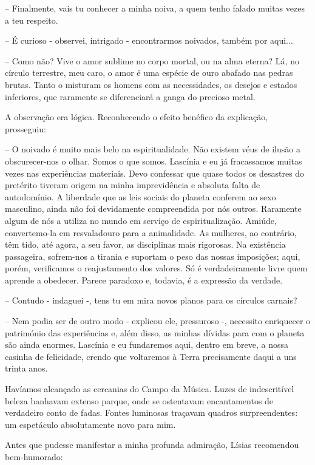 \documentclass[portuguese,12pt,a4paper]{scrbook}
\begin{document}
	– Finalmente, vais tu conhecer a minha noiva, a quem tenho falado muitas vezes a teu respeito.
	
	– É curioso - observei, intrigado - encontrarmos noivados, também por aqui...
	
	– Como não? Vive o amor sublime no corpo mortal, ou na alma eterna? Lá, no círculo terrestre, meu caro, o amor é uma espécie de ouro abafado nas pedras brutas. Tanto o misturam os homens com as necessidades, os desejos e estados inferiores, que raramente se diferenciará a ganga do precioso metal.
	
	A observação era lógica. Reconhecendo o efeito benéfico da explicação, prosseguiu:
	
	– O noivado é muito mais belo na espiritualidade. Não existem véus de ilusão a obscurecer-nos o olhar. Somos o que somos. Lascínia e eu já fracassamos muitas vezes nas experiências materiais. Devo confessar que quase todos os desastres do pretérito tiveram origem na minha imprevidência e absoluta falta de autodomínio. A liberdade que as leis sociais do planeta conferem ao sexo masculino, ainda não foi devidamente compreendida por nós outros. Raramente algum de nós a utiliza no mundo em serviço de espiritualização. Amiúde, convertemo-la em resvaladouro para a animalidade. As mulheres, ao contrário, têm tido, até agora, a seu favor, as disciplinas mais rigorosas. Na existência passageira, sofrem-nos a tirania e suportam o peso das nossas imposições; aqui, porém, verificamos o reajustamento dos valores. Só é verdadeiramente livre quem aprende a obedecer. Parece paradoxo e, todavia, é a expressão da verdade.
	
	– Contudo - indaguei -, tens tu em mira novos planos para os círculos carnais?
	
	– Nem podia ser de outro modo - explicou ele, pressuroso -, necessito enriquecer o património das experiências e, além disso, as minhas dívidas para com o planeta são ainda enormes. Lascínia e eu fundaremos aqui, dentro em breve, a nossa casinha de felicidade, crendo que voltaremos à Terra precisamente daqui a uns trinta anos.
	
	Havíamos alcançado as cercanias do Campo da Música. Luzes de indescritível beleza banhavam extenso parque, onde se ostentavam encantamentos de verdadeiro conto de fadas. Fontes luminosas traçavam quadros surpreendentes: um espetáculo absolutamente novo para mim.
	
	Antes que pudesse manifestar a minha profunda admiração, Lísias recomendou bem-humorado:
	
\end{document}
